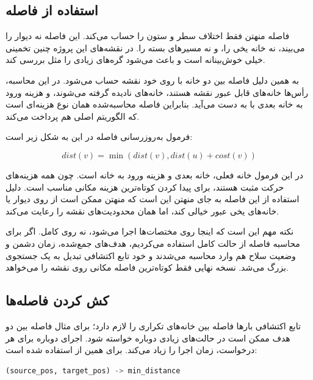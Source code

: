 \documentclass[10.5pt]{exam}
\begin{document}
\subsection{استفاده از فاصله }
فاصله منهتن فقط اختلاف سطر و ستون را حساب می‌کند. این فاصله نه دیوار را می‌بیند، نه خانه یخی را، و نه مسیرهای بسته را. در نقشه‌های این پروژه چنین تخمینی خیلی خوش‌بینانه است و باعث می‌شود
گره‌های زیادی را مثل
بررسی کند.

به همین دلیل فاصله بین دو خانه با
روی خود نقشه حساب می‌شود. در این محاسبه، رأس‌ها خانه‌های قابل عبور نقشه هستند، خانه‌های
نادیده گرفته می‌شوند، و هزینه ورود به خانه بعدی با
به دست می‌آید. بنابراین فاصله محاسبه‌شده همان نوع هزینه‌ای است که الگوریتم اصلی هم پرداخت می‌کند.

فرمول به‌روزرسانی فاصله در این
به شکل زیر است:

\[
    dist(v) = \min(dist(v), dist(u) + cost(v))
\]

در این فرمول
خانه فعلی،
خانه بعدی و
هزینه ورود به خانه
است. چون همه هزینه‌های حرکت مثبت هستند،
برای پیدا کردن کوتاه‌ترین هزینه مکانی مناسب است. دلیل استفاده از این فاصله به جای منهتن این است که منهتن ممکن است از روی دیوار یا خانه‌های یخی عبور خیالی کند، اما
همان محدودیت‌های نقشه را رعایت می‌کند.

نکته مهم این است که
اینجا روی مختصات‌ها اجرا می‌شود، نه روی
کامل. اگر برای محاسبه فاصله از
حالت کامل استفاده می‌کردیم، هدف‌های جمع‌شده، زمان دشمن و وضعیت سلاح هم وارد محاسبه می‌شدند و خود تابع اکتشافی تبدیل به یک جستجوی بزرگ می‌شد. نسخه نهایی فقط کوتاه‌ترین فاصله مکانی روی نقشه را می‌خواهد.

\subsection{کش کردن فاصله‌ها}
تابع اکتشافی بارها فاصله بین خانه‌های تکراری را لازم دارد؛ برای مثال فاصله بین دو هدف ممکن است در حالت‌های زیادی دوباره خواسته شود. اجرای دوباره
برای هر درخواست، زمان اجرا را زیاد می‌کند. برای همین از
استفاده شده است:

\begin{latin}
\begin{lstlisting}[language=Python]
(source_pos, target_pos) -> min_distance
\end{lstlisting}
\end{latin}
\end{document}

